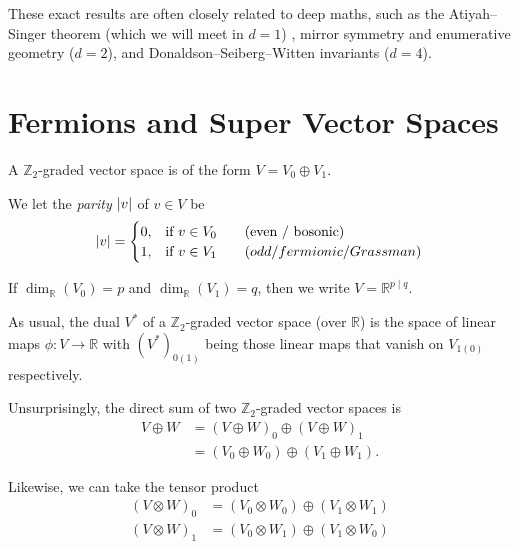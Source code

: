 These exact results are often closely related to deep maths, such as the Atiyah--Singer theorem (which we will meet in $d = 1$) , mirror symmetry and enumerative geometry ($d = 2$), and Donaldson--Seiberg--Witten invariants ($d = 4$).

\section{Fermions and Super Vector Spaces}%
\label{sec:fermions_and_super_vector_spaces}

\begin{definition}
  A $\mathbb{Z}_2$-graded vector space is of the form $V = V_0 \oplus V_1$.
\end{definition}

\begin{definition}[parity]
  We let the \emph{parity} $\abs{v}$  of $v \in V$  be
  \begin{equation}
    \abs{v} = 
    \begin{cases}
      0, & \text{if } v \in V_0 \qquad (\text{even / bosonic}) \\
      1, & \text{if } v \in V_1 \qquad (odd / fermionic / Grassman) 
    \end{cases}
  \end{equation}
\end{definition}

\begin{notation}[]
  If $\dim_{\mathbb{R}}(V_0) = p$ and $\dim_{\mathbb{R}}(V_1) = q$, then we write $V= \mathbb{R}^{p \mid q}$.
\end{notation}

As usual, the dual $V^*$ of a $\mathbb{Z}_2$-graded vector space (over $\mathbb{R}$) is the space of linear maps $\phi \colon V \to \mathbb{R}$ with $(V^*)_{0 (1)}$ being those linear maps that vanish on $V_{1 (0)}$ respectively.

Unsurprisingly, the direct sum of two $\mathbb{Z}_2$-graded vector spaces is
\begin{align}
  V \oplus W &= (V \oplus W)_0 \oplus (V \oplus W)_1 \\
	     &= (V_0 \oplus W_0) \oplus (V_1 \oplus W_1).
\end{align}

Likewise, we can take the tensor product
\begin{align}
  (V \otimes W)_0 &= (V_0 \otimes W_0) \oplus (V_1 \otimes W_1) \\
  (V \otimes W)_1 &= (V_0 \otimes W_1) \oplus (V_1 \otimes W_0)
\end{align}

